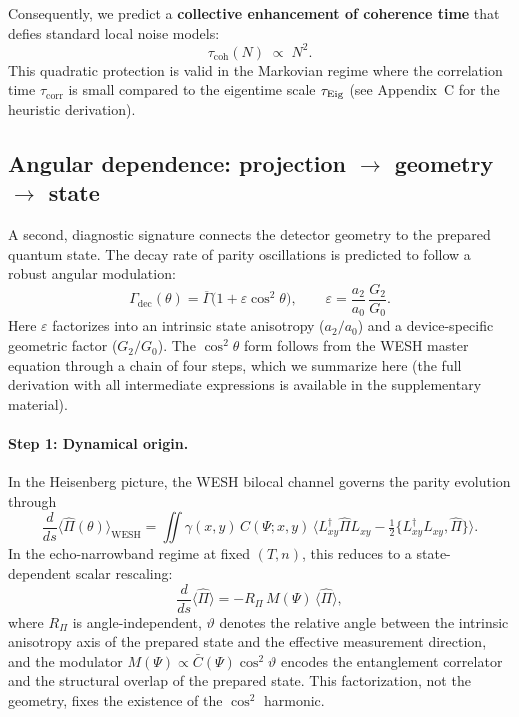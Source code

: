 \documentclass[12pt,a4paper]{article}
\numberwithin{equation}{section}
\begin{document}
Consequently, we predict a \textbf{collective enhancement of coherence time} that defies standard local noise models:
\begin{equation}
\tau_{\mathrm{coh}}(N)\;\propto\;N^2. 
\label{eq:coherence-enhancement}
\end{equation}
This quadratic protection is valid in the Markovian regime where the correlation time $\tau_{\mathrm{corr}}$ is small compared to the eigentime scale $\tau_{\rm Eig}$ (see Appendix~C for the heuristic derivation).
\vspace{0.5cm}

\subsection{Angular dependence: projection $\to$ geometry $\to$ state}
\label{subsec:ang-bridge}
\vspace{0.3cm}

A second, diagnostic signature connects the detector geometry to the prepared quantum state. The decay rate of parity oscillations is predicted to follow a robust angular modulation:
\begin{equation}
\Gamma_{\mathrm{dec}}(\theta)=\overline\Gamma\big(1+\varepsilon\cos^2\theta\big),
\qquad
\varepsilon=\frac{a_2}{a_0}\,\frac{G_2}{G_0}.
\label{eq:angular-law}
\end{equation}
Here $\varepsilon$ factorizes into an intrinsic state anisotropy ($a_2/a_0$) and a device-specific geometric factor ($G_2/G_0$). The $\cos^2\theta$ form follows from the WESH master equation through a chain of four steps, which we summarize here (the full derivation with all intermediate expressions is available in the supplementary material).

\paragraph{Step 1: Dynamical origin.}
In the Heisenberg picture, the WESH bilocal channel governs the parity evolution through
\begin{equation*}
\frac{d}{ds}\langle\hat\Pi(\theta)\rangle_{\mathrm{WESH}} = \iint \gamma(x,y)\,C(\Psi;x,y)\,\bigl\langle L_{xy}^\dagger\hat\Pi L_{xy} - \tfrac{1}{2}\{L_{xy}^\dagger L_{xy},\hat\Pi\}\bigr\rangle.
\end{equation*}
In the echo-narrowband regime at fixed $(T,n)$, this reduces to a state-dependent scalar rescaling:
\begin{equation*}
\frac{d}{ds}\langle\hat\Pi\rangle = -R_\Pi\,M(\Psi)\,\langle\hat\Pi\rangle,
\end{equation*}
where $R_\Pi$ is angle-independent, $\vartheta$ denotes the relative angle between the intrinsic anisotropy axis of the prepared state and the effective measurement direction, and the modulator $M(\Psi)\propto\bar{C}(\Psi)\cos^2\vartheta$ encodes the entanglement correlator and the structural overlap of the prepared state. This factorization, not the geometry, fixes the existence of the $\cos^2$ harmonic.
\end{document}
